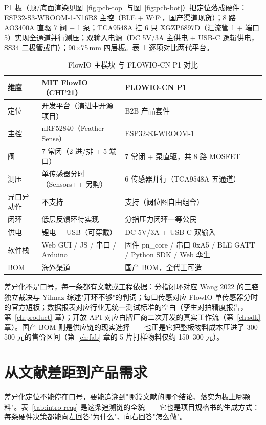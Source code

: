 P1 板（顶/底面渲染见图~\ref{fig:pcb-top} 与图~\ref{fig:pcb-bot}）把定位落成硬件：ESP32-S3-WROOM-1-N16R8 主控（BLE + WiFi，国产渠道现货）；8 路 AO3400A 直驱 7 阀 + 1 泵；TCA9548A 挂 6 只 XGZP6897D（汇流管 1 + 端口 5）实现全通道并行测压；双输入电源（DC 5V/3A 主供电 + USB-C 逻辑供电，SS34 二极管或门）；90$\times$75\,mm 四层板。表~\ref{tab:intro-vs} 逐项对比两代平台。

\begin{table}[htbp]
  \centering
  \caption{FlowIO 主模块 与 FLOWIO-CN P1 对比}
  \label{tab:intro-vs}
  \begin{tabular}{lp{5.2cm}p{5.2cm}}
    \toprule
    维度 & MIT FlowIO（CHI'21） & FLOWIO-CN P1 \\
    \midrule
    定位 & 开发平台（演进中开源项目） & B2B 产品套件 \\
    主控 & nRF52840（Feather Sense） & ESP32-S3-WROOM-1 \\
    阀 & 7 常闭（2 进/排 + 5 端口） & 7 常闭 + 泵直驱，共 8 路 MOSFET \\
    测压 & 单传感器分时（Sensors++ 另购） & 6 传感器并行（TCA9548A 五通道） \\
    异口异动作 & 不支持 & 支持（阀位图自由组合） \\
    闭环 & 低层反馈环待实现 & 分指压力闭环一等公民 \\
    供电 & 锂电 + USB（可穿戴） & DC 5V/3A + USB-C 双输入 \\
    软件栈 & Web GUI / JS / 串口 / Arduino & 固件 pn\_core / 串口 0xA5 / BLE GATT / Python SDK / Web 孪生 \\
    BOM & 海外渠道 & 国产 BOM，全代工可造 \\
    \bottomrule
  \end{tabular}
\end{table}

差异化不是口号，每一条都有文献或工程依据：分指闭环对应 Wang 2022 的三腔独立裁决与 Yilmaz 综述"开环不够"的判词；每口传感对应 FlowIO 单传感器分时的官方短板；数据报表对应行业无统一测试标准的空白（孪生对拍精度报告，第~\ref{ch:product} 章）；开放 API 对应白牌厂商二次开发的真实工作流（第~\ref{ch:sdk} 章）。国产 BOM 则是供应链的现实选择——也正是它把整板物料成本压进了 300--500 元的售价区间（第~\ref{ch:fab} 章的 5 片打样物料仅约 150--300 元）。

\section{从文献差距到产品需求}
\label{sec:intro-reqs}

差异化定位不能停在口号，要能追溯到"哪篇文献的哪个结论、落实为板上哪颗料"。表~\ref{tab:intro-reqs} 是这条追溯链的全貌——它也是项目规格书的生成方式：每条硬件决策都能向左回答"为什么"、向右回答"怎么做"。

